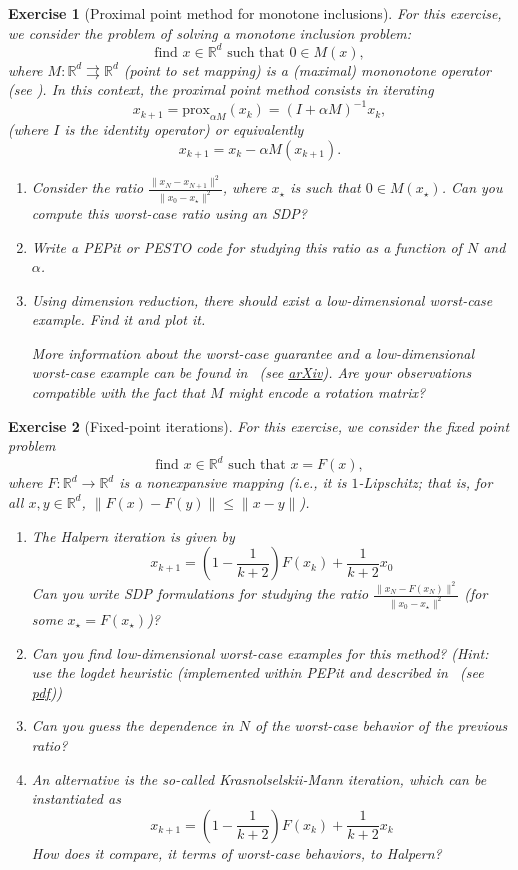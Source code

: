 \documentclass[11pt,a4paper]{article}
\newcommand{\pesto}{{PESTO }}
\newcommand{\pepit}{{PEPit }}
\newtheorem{exercise}{Exercise}
\begin{document}
\begin{exercise}[Proximal point method for monotone inclusions]\label{ex:ppm2}
	For this exercise, we consider the problem of solving a monotone inclusion problem:
	\[ \text{find } x\in\mathbb{R}^d \text{ such that } 0\in M(x),\]
	where $M:\mathbb{R}^d\rightrightarrows {\mathbb{R}^d}$ (point to set mapping) is a (maximal) mononotone operator (see ). In this context, the proximal point method consists in iterating
	\[ x_{k+1}=\mathrm{prox}_{\alpha M}(x_k)=(I+\alpha M)^{-1} x_k,\]
(where $I$ is the identity operator) or equivalently 
	\[ x_{k+1}=x_k-\alpha M(x_{k+1}).\]
	\begin{enumerate}
	\item Consider the ratio $\frac{\|x_{N}-x_{N+1}\|^2}{\|x_0-x_\star\|^2}$, where $x_\star$ is such that $0\in M(x_\star)$. Can you compute this worst-case ratio using an SDP?
	\item Write a \pepit or \pesto code for studying this ratio as a function of $N$ and $\alpha$.
	\item Using dimension reduction, there should exist a low-dimensional worst-case example. Find it and plot it.
	
	More information about the worst-case guarantee and a low-dimensional worst-case example can be found in~\cite{gu2020tight} (see \href{https://arxiv.org/pdf/1904.05495.pdf}{arXiv}). Are your observations compatible with the fact that $M$ might encode a rotation matrix?
	\end{enumerate}
	\end{exercise}
	

	
	\begin{exercise}[Fixed-point iterations]\label{ex:halpern}
For this exercise, we consider the fixed point problem
	\[ \text{find } x\in\mathbb{R}^d \text{ such that } x=F(x), \]
	where $F:\mathbb{R}^d\rightarrow \mathbb{R}^d$ is a nonexpansive mapping (i.e., it is $1$-Lipschitz; that is, for all $x,y\in\mathbb{R}^d$, $\|F(x)-F(y)\|\leqslant \|x-y\|$).
	\begin{enumerate}
	\item The Halpern iteration is given by
	\[ x_{k+1} = \left(1-\frac{1}{k+2}\right)F(x_k) + \frac{1}{k+2} x_0\]
	Can you write SDP formulations for studying the ratio $\frac{\|x_{N}-F(x_N)\|^2}{\|x_0-x_\star\|^2}$ (for some $x_\star=F(x_\star)$)?
	\item Can you find low-dimensional worst-case examples for this method? (Hint: use the logdet heuristic (implemented within \pepit and described in~\cite{fazel2003log} (see \href{https://web.stanford.edu/~boyd/papers/pdf/rank_min_heur_hankel.pdf}{pdf}))
	\item Can you guess the dependence in $N$ of the worst-case behavior of the previous ratio?
	\item An alternative is the so-called Krasnolselskii-Mann iteration, which can be instantiated as
	\[ x_{k+1} = \left(1-\frac{1}{k+2}\right)F(x_k) + \frac{1}{k+2} x_k\]
	How does it compare, it terms of worst-case behaviors, to Halpern?
	\end{enumerate}
	\end{exercise}
	
\end{document}
